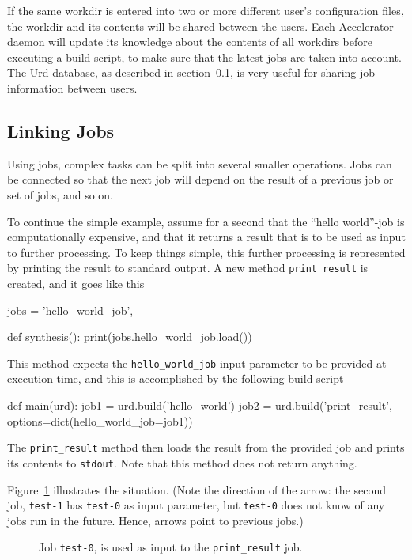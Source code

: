 If the same workdir is entered into two or more different user's
configuration files, the workdir and its contents will be shared
between the users.  Each Accelerator daemon will update its knowledge
about the contents of all workdirs before executing a build script, to
make sure that the latest jobs are taken into account.  The Urd
database, as described in section~\ref{}, is very useful for sharing
job information between users.


\subsection{Linking Jobs}

Using jobs, complex tasks can be split into several smaller
operations.  Jobs can be connected so that the next job will depend on
the result of a previous job or set of jobs, and so on.

To continue the simple example, assume for a second that the ``hello
world''-job is computationally expensive, and that it returns a result
that is to be used as input to further processing.  To keep things
simple, this further processing is represented by printing the result
to standard output.  A new method \texttt{print\_result} is created,
and it goes like this
\begin{python}
jobs = {'hello_world_job',}

def synthesis():
    print(jobs.hello_world_job.load())
\end{python}
This method expects the \texttt{hello\_world\_job} input parameter to
be provided at execution time, and this is accomplished by the
following build script
\begin{python}
def main(urd):
    job1 = urd.build('hello_world')
    job2 = urd.build('print_result', options=dict(hello_world_job=job1))
\end{python}
The \texttt{print\_result} method then loads the result from the
provided job and prints its contents to \texttt{stdout}.  Note that
this method does not return anything.

Figure~\ref{fig:execflow-print-result} illustrates the situation.
(Note the direction of the arrow: the second job, \texttt{test-1} has
\texttt{test-0} as input parameter, but \texttt{test-0} does not know
of any jobs run in the future.  Hence, arrows point to previous jobs.)

\begin{figure}[h!]
  \begin{center}
    
    \caption{Job \texttt{test-0}, is used as input to the
      \texttt{print\_result} job.}
    \label{fig:execflow-print-result}
  \end{center}
\end{figure}

